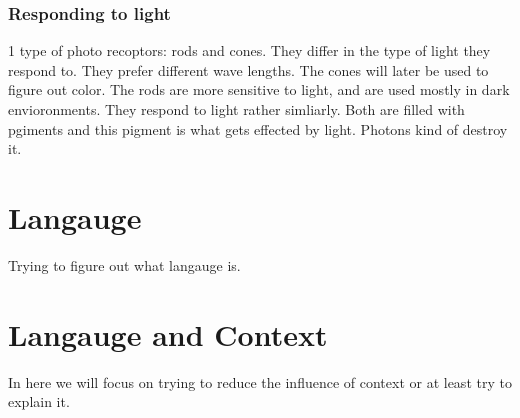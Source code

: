 \documentclass{article}
\begin{document}
\subsubsection{Responding to light}
1 type of photo recoptors: rods and cones. They differ in the type of light
they respond to. They prefer different wave lengths. The cones will later
be used to figure out color. The rods are more sensitive to light, and
are used mostly in dark envioronments. They respond to light rather simliarly.
Both are filled with pgiments and this pigment is what gets effected by light.
Photons kind of destroy it.



\section{Langauge}
Trying to figure out what langauge is.

\section{Langauge and Context}
In here we will focus on trying to reduce the influence of context or
at least try to explain it.
\end{document}
